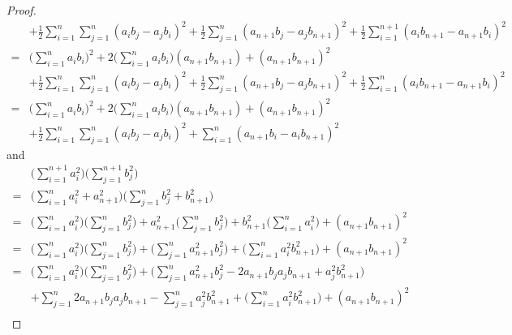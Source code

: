 \begin{proof}
\begin{align*}
          & + \frac{1}{2} \sum_{i = 1}^n \sum_{j = 1}^n (a_i b_j - a_j b_i)^2 + \frac{1}{2} \sum_{j = 1}^n (a_{n + 1} b_j - a_j b_{n + 1})^2 + \frac{1}{2} \sum_{i = 1}^{n + 1} (a_i b_{n + 1} - a_{n + 1} b_i)^2     \\
        = & \bigg(\sum_{i = 1}^n a_i b_i\bigg)^2 + 2 \bigg(\sum_{i = 1}^n a_i b_i\bigg) (a_{n + 1} b_{n + 1}) + (a_{n + 1} b_{n + 1})^2                                                                               \\
          & + \frac{1}{2} \sum_{i = 1}^n \sum_{j = 1}^n (a_i b_j - a_j b_i)^2 + \frac{1}{2} \sum_{j = 1}^n (a_{n + 1} b_j - a_j b_{n + 1})^2 + \frac{1}{2} \sum_{i = 1}^n (a_i b_{n + 1} - a_{n + 1} b_i)^2           \\
        = & \bigg(\sum_{i = 1}^n a_i b_i\bigg)^2 + 2 \bigg(\sum_{i = 1}^n a_i b_i\bigg) (a_{n + 1} b_{n + 1}) + (a_{n + 1} b_{n + 1})^2                                                                               \\
          & + \frac{1}{2} \sum_{i = 1}^n \sum_{j = 1}^n (a_i b_j - a_j b_i)^2 + \sum_{i = 1}^n (a_{n + 1} b_i - a_i b_{n + 1})^2
    \end{align*}
    and
    \begin{align*}
          & \bigg(\sum_{i = 1}^{n + 1} a_i^2\bigg) \bigg(\sum_{j = 1}^{n + 1} b_j^2\bigg)                                                                                                             \\
        = & \bigg(\sum_{i = 1}^n a_i^2 + a_{n + 1}^2\bigg) \bigg(\sum_{j = 1}^n b_j^2 + b_{n + 1}^2\bigg)                                                                                             \\
        = & \bigg(\sum_{i = 1}^n a_i^2\bigg) \bigg(\sum_{j = 1}^n b_j^2\bigg) + a_{n + 1}^2 \bigg(\sum_{j = 1}^n b_j^2\bigg) + b_{n + 1}^2 \bigg(\sum_{i = 1}^n a_i^2\bigg) + (a_{n + 1} b_{n + 1})^2 \\
        = & \bigg(\sum_{i = 1}^n a_i^2\bigg) \bigg(\sum_{j = 1}^n b_j^2\bigg) + \bigg(\sum_{j = 1}^n a_{n + 1}^2 b_j^2\bigg) + \bigg(\sum_{i = 1}^n a_i^2 b_{n + 1}^2\bigg) + (a_{n + 1} b_{n + 1})^2 \\
        = & \bigg(\sum_{i = 1}^n a_i^2\bigg) \bigg(\sum_{j = 1}^n b_j^2\bigg) + \bigg(\sum_{j = 1}^n a_{n + 1}^2 b_j^2 - 2 a_{n + 1} b_j a_j b_{n + 1} + a_j^2 b_{n + 1}^2\bigg)                      \\
          & + \sum_{j = 1}^n 2 a_{n + 1} b_j a_j b_{n + 1} - \sum_{j = 1}^n a_j^2 b_{n + 1}^2 + \bigg(\sum_{i = 1}^n a_i^2 b_{n + 1}^2\bigg) + (a_{n + 1} b_{n + 1})^2                                \\

\end{align*}
\end{proof}
